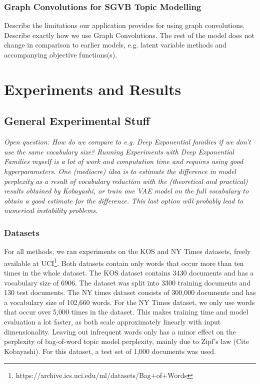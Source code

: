 \documentclass{report}
\begin{document}
\subsection{Graph Convolutions for SGVB Topic Modelling}
Describe the limitations our application provides for using graph convolutions.\\
Describe exactly how we use Graph Convolutions. The rest of the model does not change in comparison to earlier models, e.g. latent variable methods and accompanying objective functions(s).


\chapter{Experiments and Results}
\section{General Experimental Stuff}
	\textit{Open question: How do we compare to e.g. Deep Exponential families if we don't use the same vocabulary size? Running Experiments with Deep Exponential Families myself is a lot of work and computation time and requires using good hyperparameters. One (mediocre) idea is to estimate the difference in model perplexity as a result of vocabulary reduction with the (theoretical and practical) results obtained by Kobayashi, or train one VAE model on the full vocabulary to obtain a good estimate for the difference. This last option will probably lead to numerical instability problems.}
	\subsection{Datasets}
	For all methods, we ran experiments on the KOS and NY Times datasets, freely available at UCI\footnote{https://archive.ics.uci.edu/ml/datasets/Bag+of+Words}. Both datasets contain only words that occur more than ten times in the whole dataset. The KOS dataset contains 3430 documents and has a vocabulary size of 6906. The dataset was split into 3300 training documents and 130 test documents. The NY times dataset consists of 300,000 documents and has a vocabulary size of 102,660 words. For the NY Times dataset, we only use words that occur over 5,000 times in the dataset. This makes training time and model evaluation a lot faster, as both scale approximately linearly with input dimensionality. Leaving out infrequent words only has a minor effect on the perplexity of bag-of-word topic model perplexity, mainly due to Zipf's law (Cite Kobayashi). For this dataset, a test set of 1,000 documents was used.
	\\
\end{document}
